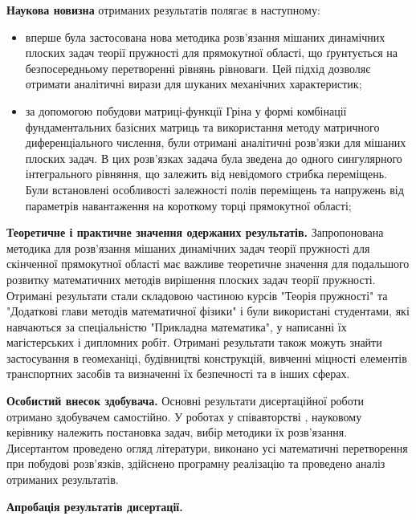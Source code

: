 \textbf{Наукова новизна} отриманих результатів полягає в наступному:
\begin{itemize}
    \item вперше була застосована нова методика розв'язання мішаних динамічних плоских задач теорії пружності для прямокутної області,
    що ґрунтується на безпосередньому перетворенні рівнянь рівноваги. Цей підхід дозволяє отримати аналітичні вирази для шуканих механічних характеристик;
    \item за допомогою побудови матриці-функції Гріна у формі комбінації фундаментальних базісних матриць та використання методу матричного диференціального числення,
    були отримані аналітичні розв'язки для мішаних плоских задач. В цих розв'язках задача була зведена до одного сингулярного інтегрального рівняння, що залежить від невідомого стрибка переміщень.
    Були встановлені особливості залежності полів переміщень та напружень від параметрів навантаження на короткому торці прямокутної області;
\end{itemize}

\textbf{Теоретичне і практичне значення одержаних результатів.} 
Запропонована методика для розв'язання мішаних динамічних задач теорії пружності для скінченної прямокутної області має важливе теоретичне значення для подальшого розвитку математичних методів вирішення плоских задач теорії пружності.
Отримані результати стали складовою частиною курсів "Теорія пружності" та "Додаткові глави методів математичної фізики" і були використані студентами, які навчаються за спеціальністю "Прикладна математика", у написанні їх магістерських і дипломних робіт.
Отримані результати також можуть знайти застосування в геомеханіці, будівництві конструкцій, вивченні міцності елементів транспортних засобів та визначенні їх безпечності та в інших сферах.

\textbf{Особистий внесок здобувача.}
Основні результати дисертаційної роботи отримано здобувачем самостійно.
У роботах у співавторстві \cite{pozhylenkov_1, pozhylenkov_2, pozhylenkov_3, pozhylenkov_4, pozhylenkov_5, pozhylenkov_6},
науковому керівнику належить постановка задач, вибір методики їх розв’язання.
Дисертантом проведено огляд літератури, виконано усі математичні перетворення при побудові розв’язків,
здійснено програмну реалізацію та проведено аналіз отриманих результатів.

\textbf{Апробація результатів дисертації.}

